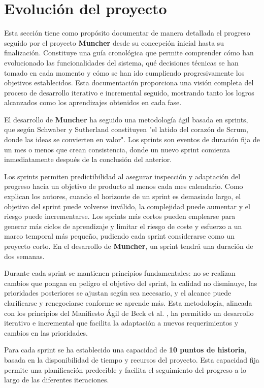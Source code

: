 \section*{Evolución del proyecto}

Esta sección tiene como propósito documentar de manera detallada el progreso seguido por el proyecto \textbf{Muncher} desde su concepción inicial hasta su finalización. Constituye una guía cronológica que permite comprender cómo han evolucionado las funcionalidades del sistema, qué decisiones técnicas se han tomado en cada momento y cómo se han ido cumpliendo progresivamente los objetivos establecidos. Esta documentación proporciona una visión completa del proceso de desarrollo iterativo e incremental seguido, mostrando tanto los logros alcanzados como los aprendizajes obtenidos en cada fase.

El desarrollo de \textbf{Muncher} ha seguido una metodología ágil basada en sprints, que según Schwaber y Sutherland \cite{Schwaber2020} constituyen "el latido del corazón de Scrum, donde las ideas se convierten en valor". Los sprints son eventos de duración fija de un mes o menos que crean consistencia, donde un nuevo sprint comienza inmediatamente después de la conclusión del anterior.

Los sprints permiten predictibilidad al asegurar inspección y adaptación del progreso hacia un objetivo de producto al menos cada mes calendario. Como explican los autores, cuando el horizonte de un sprint es demasiado largo, el objetivo del sprint puede volverse inválido, la complejidad puede aumentar y el riesgo puede incrementarse. Los sprints más cortos pueden emplearse para generar más ciclos de aprendizaje y limitar el riesgo de coste y esfuerzo a un marco temporal más pequeño, pudiendo cada sprint considerarse como un proyecto corto. En el desarrollo de \textbf{Muncher}, un sprint tendrá una duración de dos semanas.

Durante cada sprint se mantienen principios fundamentales: no se realizan cambios que pongan en peligro el objetivo del sprint, la calidad no disminuye, las prioridades posteriores se ajustan según sea necesario, y el alcance puede clarificarse y renegociarse conforme se aprende más. Esta metodología, alineada con los principios del Manifiesto Ágil de Beck et al. \cite{Beck2001}, ha permitido un desarrollo iterativo e incremental que facilita la adaptación a nuevos requerimientos y cambios en las prioridades.

Para cada sprint se ha establecido una capacidad de \textbf{10 puntos de historia}, basada en la disponibilidad de tiempo y recursos del proyecto. Esta capacidad fija permite una planificación predecible y facilita el seguimiento del progreso a lo largo de las diferentes iteraciones.

